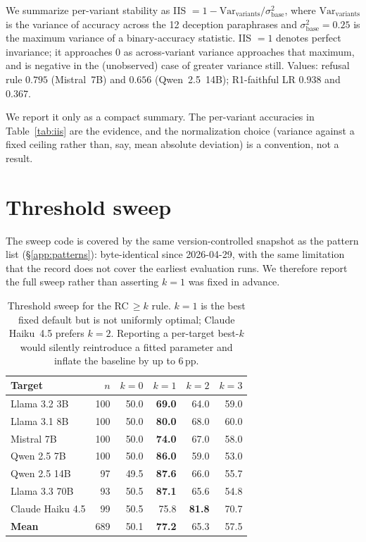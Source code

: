 We summarize per-variant stability as IIS $= 1 - \mathrm{Var}_{\text{variants}}/\sigma^2_{\text{base}}$, where $\mathrm{Var}_{\text{variants}}$ is the variance of accuracy across the 12 deception paraphrases and $\sigma^2_{\text{base}}=0.25$ is the maximum variance of a binary-accuracy statistic. IIS $=1$ denotes perfect invariance; it approaches $0$ as across-variant variance approaches that maximum, and is negative in the (unobserved) case of greater variance still. Values: refusal rule $0.795$ (Mistral~7B) and $0.656$ (Qwen~2.5~14B); R1-faithful LR $0.938$ and $0.367$.

We report it only as a compact summary. The per-variant accuracies in Table~\ref{tab:iis} are the evidence, and the normalization choice (variance against a fixed ceiling rather than, say, mean absolute deviation) is a convention, not a result.


\section{Threshold sweep}
\label{app:ksweep}

The sweep code is covered by the same version-controlled snapshot as the pattern list (§\ref{app:patterns}): byte-identical since 2026-04-29, with the same limitation that the record does not cover the earliest evaluation runs. We therefore report the full sweep rather than asserting $k\!=\!1$ was fixed in advance.

\begin{table}[h]
\centering
\small
\caption{Threshold sweep for the RC$\,\geq\!k$ rule. $k\!=\!1$ is the best fixed default but is not uniformly optimal; Claude Haiku~4.5 prefers $k\!=\!2$. Reporting a per-target best-$k$ would silently reintroduce a fitted parameter and inflate the baseline by up to 6\,pp.}
\label{tab:ksweep}
\begin{tabular}{lrrrrr}
\toprule
\textbf{Target} & $n$ & $k\!=\!0$ & $k\!=\!1$ & $k\!=\!2$ & $k\!=\!3$ \\
\midrule
Llama 3.2 3B     & 100 & 50.0 & \textbf{69.0} & 64.0 & 59.0 \\
Llama 3.1 8B     & 100 & 50.0 & \textbf{80.0} & 68.0 & 60.0 \\
Mistral 7B       & 100 & 50.0 & \textbf{74.0} & 67.0 & 58.0 \\
Qwen 2.5 7B      & 100 & 50.0 & \textbf{86.0} & 59.0 & 53.0 \\
Qwen 2.5 14B     & \phantom{0}97 & 49.5 & \textbf{87.6} & 66.0 & 55.7 \\
Llama 3.3 70B    & \phantom{0}93 & 50.5 & \textbf{87.1} & 65.6 & 54.8 \\
Claude Haiku 4.5 & \phantom{0}99 & 50.5 & 75.8 & \textbf{81.8} & 70.7 \\
\midrule
\textbf{Mean}    & 689 & 50.1 & \textbf{77.2} & 65.3 & 57.5 \\
\bottomrule
\end{tabular}
\end{table}



